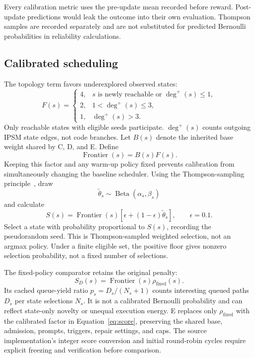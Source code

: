 \documentclass[final,5p,times,number]{elsarticle}
\begin{document}
Every calibration metric uses the pre-update mean recorded before reward. Post-update predictions would leak the outcome into their own evaluation. Thompson samples are recorded separately and are not substituted for predicted Bernoulli probabilities in reliability calculations.

\subsection{Calibrated scheduling}
The topology term favors underexplored observed states:
\begin{equation}
F(s)=
\begin{cases}
4,&s\text{ is newly reachable or }\deg^+(s)\leq1,\\
2,&1<\deg^+(s)\leq3,\\
1,&\deg^+(s)>3.
\end{cases}
\end{equation}
Only reachable states with eligible seeds participate. $\deg^+(s)$ counts outgoing IPSM state edges, not code branches. Let $B(s)$ denote the inherited base weight shared by C, D, and E. Define
\begin{equation}
\operatorname{Frontier}(s)=B(s)F(s).
\end{equation}
Keeping this factor and any warm-up policy fixed prevents calibration from simultaneously changing the baseline scheduler. Using the Thompson-sampling principle~\cite{thompson1933}, draw
\begin{equation}
\widetilde{\theta}_s\sim\operatorname{Beta}(\alpha_s,\beta_s)
\end{equation}
and calculate
\begin{equation}
S(s)=\operatorname{Frontier}(s)[\epsilon+(1-\epsilon)\widetilde{\theta}_s],
\qquad\epsilon=0.1.
\label{eq:score}
\end{equation}
Select a state with probability proportional to $S(s)$, recording the pseudorandom seed. This is Thompson-sampled weighted selection, not an argmax policy. Under a finite eligible set, the positive floor gives nonzero selection probability, not a fixed number of selections.

The fixed-policy comparator retains the original penalty:
\begin{equation}
S_D(s)=\operatorname{Frontier}(s)\rho_{\mathrm{fixed}}(s).
\end{equation}
Its cached queue-yield ratio $p_s=D_s/(N_s+1)$ counts interesting queued paths $D_s$ per state selections $N_s$. It is not a calibrated Bernoulli probability and can reflect state-only novelty or unequal execution energy. E replaces only $\rho_{\mathrm{fixed}}$ with the calibrated factor in Equation~\ref{eq:score}, preserving the shared base, admission, prompts, triggers, repair settings, and caps. The source implementation's integer score conversion and initial round-robin cycles require explicit freezing and verification before comparison.
\end{document}
